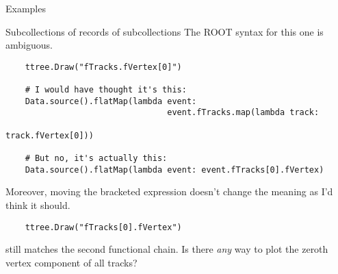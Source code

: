 \documentclass{beamer}
\begin{document}
\begin{frame}[fragile]{Examples}
\begin{block}{Subcollections of records of subcollections}
The ROOT syntax for this one is ambiguous.

{\scriptsize \begin{verbatim}
    ttree.Draw("fTracks.fVertex[0]")

    # I would have thought it's this:
    Data.source().flatMap(lambda event:
                                 event.fTracks.map(lambda track:
                                                          track.fVertex[0]))

    # But no, it's actually this:
    Data.source().flatMap(lambda event: event.fTracks[0].fVertex)
\end{verbatim}}

Moreover, moving the bracketed expression doesn't change the meaning as I'd think it should.

{\scriptsize \begin{verbatim}
    ttree.Draw("fTracks[0].fVertex")
\end{verbatim}}

still matches the second functional chain. Is there {\it any} way to plot the zeroth vertex component of all tracks?
\end{block}
\end{frame}









\end{document}

